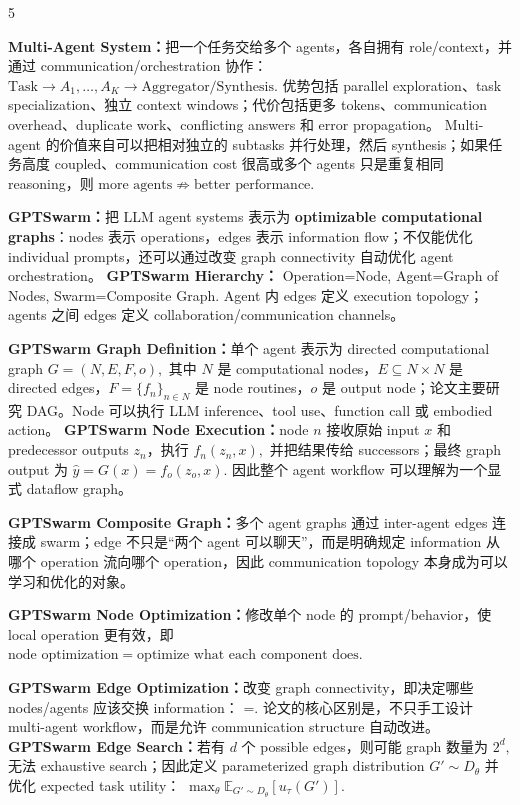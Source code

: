 \documentclass[a4paper, landscape]{article}
\begin{document}
\begin{multicols}{5}
\par \textbf{Multi-Agent System：}把一个任务交给多个 agents，各自拥有 role/context，并通过 communication/orchestration 协作：
\(
\text{Task}\rightarrow A_1,\ldots,A_K\rightarrow\text{Aggregator/Synthesis}.
\)
优势包括 parallel exploration、task specialization、独立 context windows；代价包括更多 tokens、communication overhead、duplicate work、conflicting answers 和 error propagation。
Multi-agent 的价值来自可以把相对独立的 subtasks 并行处理，然后 synthesis；如果任务高度 coupled、communication cost 很高或多个 agents 只是重复相同 reasoning，则
\(
\text{more agents}\not\Rightarrow\text{better performance}.
\)

\par \textbf{GPTSwarm：}把 LLM agent systems 表示为 \textbf{optimizable computational graphs}：nodes 表示 operations，edges 表示 information flow；不仅能优化 individual prompts，还可以通过改变 graph connectivity 自动优化 agent orchestration。
\textbf{GPTSwarm Hierarchy：}
Operation=Node,
Agent=Graph of Nodes,
Swarm=Composite Graph.
Agent 内 edges 定义 execution topology；agents 之间 edges 定义 collaboration/communication channels。

\par \textbf{GPTSwarm Graph Definition：}单个 agent 表示为 directed computational graph
\(
G=(N,E,F,o),
\)
其中 \(N\) 是 computational nodes，\(E\subseteq N\times N\) 是 directed edges，\(F=\{f_n\}_{n\in N}\) 是 node routines，\(o\) 是 output node；论文主要研究 DAG。Node 可以执行 LLM inference、tool use、function call 或 embodied action。
\textbf{GPTSwarm Node Execution：}node \(n\) 接收原始 input \(x\) 和 predecessor outputs \(z_n\)，执行
\(
f_n(z_n,x),
\)
并把结果传给 successors；最终 graph output 为
\(
\hat y=G(x)=f_o(z_o,x).
\)
因此整个 agent workflow 可以理解为一个显式 dataflow graph。

\par \textbf{GPTSwarm Composite Graph：}多个 agent graphs 通过 inter-agent edges 连接成 swarm；edge 不只是“两个 agent 可以聊天”，而是明确规定 information 从哪个 operation 流向哪个 operation，因此 communication topology 本身成为可以学习和优化的对象。

\par \textbf{GPTSwarm Node Optimization：}修改单个 node 的 prompt/behavior，使 local operation 更有效，即
\(
\text{node optimization}=\text{optimize what each component does}.
\)

\par \textbf{GPTSwarm Edge Optimization：}改变 graph connectivity，即决定哪些 nodes/agents 应该交换 information：
=.
论文的核心区别是，不只手工设计 multi-agent workflow，而是允许 communication structure 自动改进。
\textbf{GPTSwarm Edge Search：}若有 \(d\) 个 possible edges，则可能 graph 数量为
\(
2^d,
\)
无法 exhaustive search；因此定义 parameterized graph distribution
\(
G'\sim D_\theta
\)
并优化 expected task utility：
\(
\max_\theta
\mathbb E_{G'\sim D_\theta}
[u_\tau(G')].
\)


\end{multicols}
\end{document}
